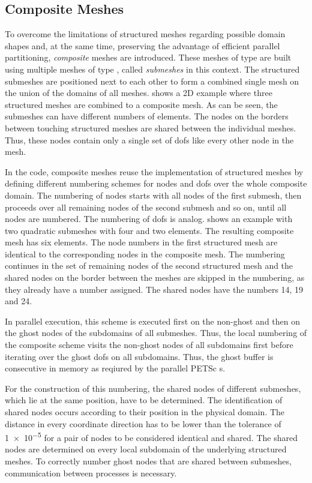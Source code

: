 \subsection{Composite Meshes}\label{sec:composite_meshes}

To overcome the limitations of structured meshes regarding possible domain shapes and, at the same time, preserving the advantage of efficient parallel partitioning, \emph{composite} meshes are introduced. These meshes of type  are built using multiple meshes of type , called \emph{submeshes} in this context. The structured submeshes are positioned next to each other to form a combined single mesh on the union of the domains of all meshes.  shows a 2D example where three structured meshes are combined to a composite mesh. As can be seen, the submeshes can have different numbers of elements.
The nodes on the borders between touching structured meshes are shared between the individual meshes. Thus, these nodes contain only a single set of dofs like every other node in the mesh.

In the code, composite meshes reuse the implementation of structured meshes by defining different numbering schemes for nodes and dofs over the whole composite domain. The numbering of nodes starts with all nodes of the first submesh, then proceeds over all remaining nodes of the second submesh and so on, until all nodes are numbered. The numbering of dofs is analog.  shows an example with two quadratic submeshes with four and two elements. The resulting composite mesh has six elements. The node numbers in the first structured mesh are identical to the corresponding nodes in the composite mesh. The numbering continues in the set of remaining nodes of the second structured mesh and the shared nodes on the border between the meshes are skipped in the numbering, as they already have a number assigned. The shared nodes have the numbers 14, 19 and 24.

In parallel execution, this scheme is executed first on the non-ghost and then on the ghost nodes of the subdomains of all submeshes. Thus, the local numbering of the composite scheme visits the non-ghost nodes of all subdomains first before iterating over the ghost dofs on all subdomains. Thus, the ghost buffer is consecutive in memory as reqiured by the parallel PETSc \Vec{}s.

For the construction of this numbering, the shared nodes of different submeshes, which lie at the same position, have to be determined.
The identification of shared nodes occurs according to their position in the physical domain. The distance in every coordinate direction has to be lower than the tolerance of \num{1e-5} for a pair of nodes to be considered identical and shared. The shared nodes are determined on every local subdomain of the underlying structured meshes. To correctly number ghost nodes that are shared between submeshes, communication between processes is necessary.

